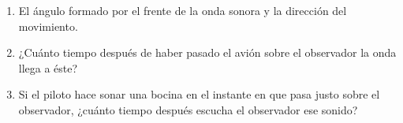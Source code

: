 \documentclass[11pt,spanish,a4paper]{article}
\begin{document}
\begin{enumerate}
\begin{enumerate}
\item El ángulo formado por el frente de la onda sonora y la dirección del
movimiento.
\item ¿Cuánto tiempo después de haber pasado el avión sobre el observador
la onda llega a éste?
\item Si el piloto hace sonar una bocina en el instante en que pasa justo
sobre el observador, ¿cuánto tiempo después escucha el observador
ese sonido?
\end{enumerate}



\end{enumerate}
\end{document}
